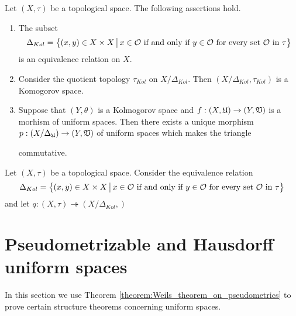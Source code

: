 \begin{theorem}\label{theorem:universal_Kolomogorov_quotient}
Let $(X,\tau)$ be a topological space. The following assertions hold.
\begin{enumerate}[label=\emph{\textbf{(\arabic*)}}, leftmargin=*]
\item The subset
$$\Delta_{Kol} = \big\{(x,y) \in X\times X\,\big|\,x\in {\mathcal O}\mbox{ if and only if }y\in {\mathcal O}\mbox{ for every set }{\mathcal O}\mbox{ in }\tau\big\}$$
is an equivalence relation on $X$.
\item Consider the quotient topology $\tau_{Kol}$ on $X/\Delta_{Kol}$. Then $\left(X/\Delta_{Kol},\tau_{Kol}\right)$ is a Komogorov space.

\item Suppose that $\left(Y,\theta\right)$ is a Kolmogorov space and $f:\left(X,{\mathfrak U}\right)\rightarrow \left(Y,{\mathfrak V}\right)$ is a morhism of uniform spaces. Then there exists a unique morphism $p:\left(X/\Delta_{{\mathfrak U}}\right)\rightarrow \left(Y,{\mathfrak V}\right)$ of uniform spaces which makes the triangle
\begin{center}
\end{center}
commutative.
\end{enumerate}
\end{theorem}

\begin{definition}
Let $(X,\tau)$ be a topological space. Consider the equivalence relation
$$\Delta_{Kol} = \big\{(x,y) \in X\times X\,\big|\,x\in {\mathcal O}\mbox{ if and only if }y\in {\mathcal O}\mbox{ for every set }{\mathcal O}\mbox{ in }\tau\big\}$$
and let $q:\left(X,\tau\right)\twoheadrightarrow \left(X/\Delta_{Kol},\right)$
\end{definition}

\section{Pseudometrizable and Hausdorff uniform spaces}
\noindent
In this section we use Theorem \ref{theorem:Weils_theorem_on_pseudometrics} to prove certain structure theorems concerning uniform spaces. 

